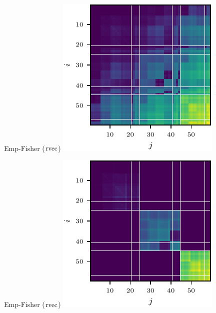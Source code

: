 \begin{figure}[t!]
\begin{minipage}[t]{0.485\linewidth}
  \end{minipage}
  \\
  \begin{minipage}[t]{0.485\linewidth}
    \centering
    Emp-Fisher ($\operatorname{rvec}$)\vspace{1ex}
    \includegraphics[width=0.8\linewidth]{../kfs/plots/synthetic_rvec_empfisher_full.pdf}
  \end{minipage}
  \hfill
  \begin{minipage}[t]{0.485\linewidth}
    \centering
    Emp-Fisher ($\operatorname{rvec}$)\vspace{1ex}
    \includegraphics[width=0.8\linewidth]{../kfs/plots/synthetic_rvec_empfisher_kfac.pdf}

\end{minipage}
\end{figure}
